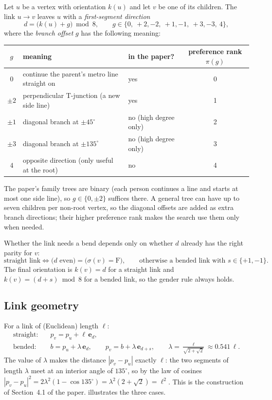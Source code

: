 \documentclass[11pt,a4paper]{article}
\newcommand{\dirv}[1]{\mathbf{e}_{#1}}
\newcommand{\len}{\ell}
\begin{document}
Let $u$ be a vertex with orientation $k(u)$ and let $v$ be one of its children. The link $u\to v$ leaves $u$ with a \emph{first-segment direction}
\[
  d = \bigl(k(u)+g\bigr) \bmod 8, \qquad g\in\{0,\ +2,-2,\ +1,-1,\ +3,-3,\ 4\},
\]
where the \emph{branch offset} $g$ has the following meaning:

\begin{center}
\small
\begin{tabular}{@{}cll c@{}}
\toprule
$g$ & meaning & in the paper? & preference rank $\pi(g)$\\
\midrule
$0$ & continue the parent's metro line straight on & yes & 0\\
$\pm2$ & perpendicular T-junction (a new side line) & yes & 1\\
$\pm1$ & diagonal branch at $\pm45^\circ$ & no (high degree only) & 2\\
$\pm3$ & diagonal branch at $\pm135^\circ$ & no (high degree only) & 3\\
$4$ & opposite direction (only useful at the root) & no & 4\\
\bottomrule
\end{tabular}
\end{center}

The paper's family trees are binary (each person continues a line and starts at most one side line), so $g\in\{0,\pm2\}$ suffices there. A general tree can have up to seven children per non-root vertex, so the diagonal offsets are added as extra branch directions; their higher preference rank makes the search use them only when needed.

Whether the link needs a bend depends only on whether $d$ already has the right parity for $v$:
\[
  \text{straight link} \iff \bigl(d \text{ even}\bigr) = \bigl(\sigma(v)=\mathrm F\bigr), \qquad
  \text{otherwise a bended link with } s\in\{+1,-1\}.
\]
The final orientation is $k(v)=d$ for a straight link and $k(v)=(d+s)\bmod 8$ for a bended link, so the gender rule always holds.

\subsection{Link geometry}

For a link of (Euclidean) length $\len$:
\begin{align*}
  \text{straight:}\quad & p_v = p_u + \len\,\dirv{d},\\
  \text{bended:}\quad & b = p_u + \lambda\,\dirv{d},\qquad p_v = b + \lambda\,\dirv{d+s},\qquad \lambda = \frac{\len}{\sqrt{2+\sqrt2}} \approx 0.541\,\len .
\end{align*}
The value of $\lambda$ makes the distance $|p_v-p_u|$ exactly $\len$: the two segments of length $\lambda$ meet at an interior angle of $135^\circ$, so by the law of cosines $|p_v-p_u|^2 = 2\lambda^2(1-\cos 135^\circ) = \lambda^2(2+\sqrt2)=\len^2$. This is the construction of Section~4.1 of the paper.  illustrates the three cases.
\end{document}
